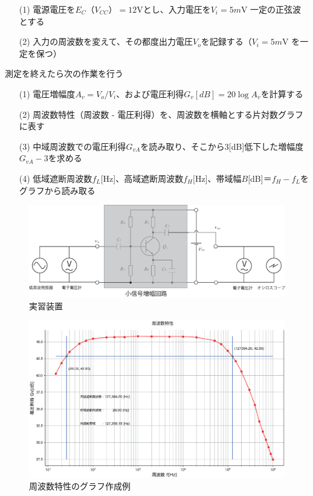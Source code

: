 \documentclass[uplatex,a4paper,11pt,oneside,openany]{jsbook}
\begin{document}
\begin{enumerate}
	\item[(1)] 電源電圧を$E_C（V_{CC}）=12$Vとし、入力電圧を$V_i=5m$V 一定の正弦波とする
	\item[(2)] 入力の周波数を変えて、その都度出力電圧$V_o$を記録する（$V_i=5m$V を一定を保つ）
\end{enumerate}

測定を終えたら次の作業を行う

\begin{enumerate}
	\item[(1)] 電圧増幅度$A_v=V_o/V_i$、および電圧利得$G_v[dB]=20\log A_v$を計算する
	\item[(2)] 周波数特性（周波数 - 電圧利得）を、周波数を横軸とする片対数グラフに表す
	\item[(3)] 中域周波数での電圧利得$G_{vA}$を読み取り、そこから$3$[dB]低下した増幅度$G_{vA}-3$を求める
	\item[(4)] 低域遮断周波数$f_L$[Hz]、高域遮断周波数$f_H$[Hz]、帯域幅$B$[dB]$＝f_H-f_L$をグラフから読み取る
\end{enumerate}

	\begin{figure}[H]
		\centering
		\includegraphics[keepaspectratio, scale=0.48, angle=0]
		{figs/eps/exp0.eps}
		\caption{実習装置}
		\label{fig:exp0}
	\end{figure}
	
	
	\begin{figure}[H]
		\centering
		\includegraphics[keepaspectratio, scale=0.48, angle=0]
		{figs/eps/freqcharM1YExample.eps}
		\caption{周波数特性のグラフ作成例}
		\label{fig:freqcharM1Yd}
	\end{figure}
\end{document}
